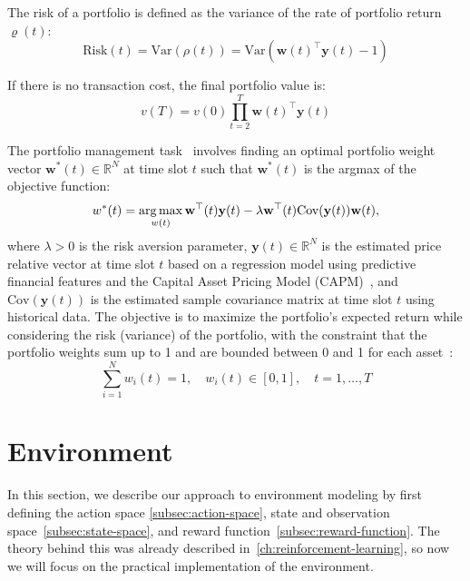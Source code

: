 \documentclass[../xlapes02]{subfiles}
\begin{document}
    The risk of a portfolio is defined as the variance of the rate of portfolio return $\varrho(t)$:
    \begin{equation}
        \text{Risk}(t)=\text{Var}(\rho(t))=\text{Var}(\mathbf{w}(t)^\top \mathbf{y}(t) - 1)
    \end{equation}

    If there is no transaction cost, the final portfolio value is:
    \begin{equation}
        v(T) = v(0) \prod_{t=2}^T\mathbf{w}(t)^\top \mathbf{y}(t)
    \end{equation}

    The portfolio management task~\cite{enwiki:1043516653} involves finding an optimal portfolio weight vector $\mathbf{w}^*(t) \in \mathbb{R}^N$ at time slot $t$ such that $\mathbf{w}^*(t)$ is the argmax of the objective function:
    \begin{equation}
        w^*(t)=\operatorname*{arg\,max}_{w(t)}\mathbf{w}^\top(t)\mathbf{y}(t)-\lambda\mathbf{w}^\top(t)\text{Cov}(\mathbf{y}(t))\mathbf{w}(t),
    \end{equation}
    where $\lambda > 0$ is the risk aversion parameter, $\mathbf{y}(t) \in \mathbb{R}^N$ is the estimated price relative vector at time slot $t$ based on a regression model using predictive financial features and the Capital Asset Pricing Model (CAPM)~\cite{fama-2004}, and $\text{Cov}(\mathbf{y}(t))$ is the estimated sample covariance matrix at time slot $t$ using historical data. The objective is to maximize the portfolio's expected return while considering the risk (variance) of the portfolio, with the constraint that the portfolio weights sum up to 1 and are bounded between 0 and 1 for each asset~\cite{finrl-portfolio-allocation-2020}:
    \begin{equation}
        \sum_{i=1}^{N}w_i(t)=1,\quad w_i(t)\in[0,1],\quad t=1,\ldots,T
    \end{equation}


    \section{Environment}\label{sec:environment}
    In this section, we describe our approach to environment modeling by first defining the action space \cref{subsec:action-space}, state and observation space~\cref{subsec:state-space}, and reward function~\cref{subsec:reward-function}. The theory behind this was already described in~\cref{ch:reinforcement-learning}, so now we will focus on the practical implementation of the environment.
\end{document}
